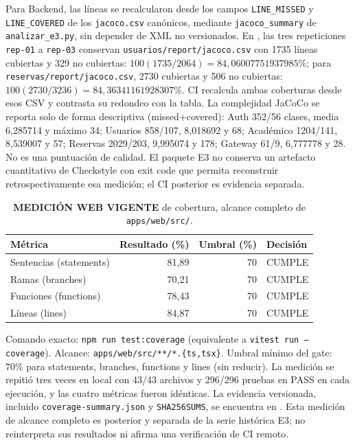 Para Backend, las líneas se recalcularon desde los campos \texttt{LINE\_MISSED}
y \texttt{LINE\_COVERED} de los \texttt{jacoco.csv} canónicos, mediante
\texttt{jacoco\_summary} de \texttt{analizar\_e3.py}, sin depender de XML no
versionados. En
,
las tres repeticiones \texttt{rep-01} a \texttt{rep-03} conservan
\texttt{usuarios/report/jacoco.csv} con 1735 líneas cubiertas y 329 no cubiertas:
$100(1735/2064)=84,06007751937985\%$; para
\texttt{reservas/report/jacoco.csv}, 2730 cubiertas y 506 no cubiertas:
$100(2730/3236)=84,36341161928307\%$. CI recalcula ambas coberturas desde
esos CSV y contrasta su redondeo con la tabla. La complejidad
JaCoCo se reporta solo de forma descriptiva (missed+covered): Auth 352/56
clases, media 6,285714 y máximo 34; Usuarios 858/107, 8,018692 y 68;
Académico 1204/141, 8,539007 y 57; Reservas 2029/203, 9,995074 y 178;
Gateway 61/9, 6,777778 y 28. No es una puntuación de calidad. El paquete E3
no conserva un artefacto cuantitativo de Checkstyle con exit code que permita
reconstruir retrospectivamente esa medición; el CI posterior es evidencia separada.

\begin{table}[ht]
  \centering
  \small
  \caption{\textbf{MEDICIÓN WEB VIGENTE} de cobertura, alcance completo de \texttt{apps/web/src/}.}
  \label{tab:mantenibilidad-web-vigente}
  \begin{tabular}{|l|r|r|l|}
    \hline
    \textbf{Métrica} & \textbf{Resultado (\%)} & \textbf{Umbral (\%)} & \textbf{Decisión} \\
    \hline
    Sentencias (statements) & 81,89 & 70 & CUMPLE \\
    Ramas (branches) & 70,21 & 70 & CUMPLE \\
    Funciones (functions) & 78,43 & 70 & CUMPLE \\
    Líneas (lines) & 84,87 & 70 & CUMPLE \\
    \hline
  \end{tabular}
\end{table}

Comando exacto: \texttt{npm run test:coverage} (equivalente a \texttt{vitest run --coverage}).
Alcance: \texttt{apps/web/src/**/*.\{ts,tsx\}}. Umbral mínimo del gate: 70\%
para statements, branches, functions y lines (sin reducir). La medición se
repitió tres veces en local con 43/43 archivos y 296/296 pruebas en PASS en
cada ejecución, y las cuatro métricas fueron idénticas. La evidencia
versionada, incluido \texttt{coverage-summary.json} y \texttt{SHA256SUMS}, se
encuentra en . Esta
medición de alcance completo es posterior y separada de la serie histórica E3;
no reinterpreta sus resultados ni afirma una verificación de CI remoto.

